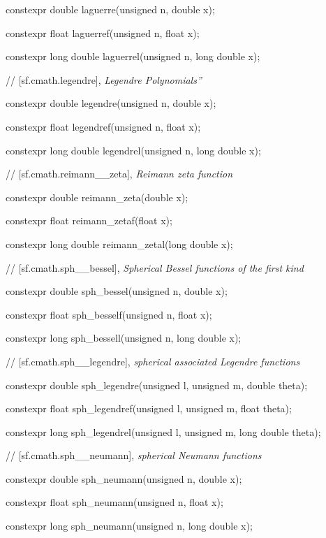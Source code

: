 \documentclass[prd,twocolumn,amsmath,amssymb,nofootinbib,eqsecnum]{revtex4-1}
\newcommand{\highlight}[1]{{\color{red} #1}}
\begin{document}
{\highlight{constexpr} double laguerre(unsigned n, double x);
	
\highlight{constexpr} float laguerref(unsigned n, float x);
	
\highlight{constexpr} long double laguerrel(unsigned n, long double x);

\vspace{2ex}
// [sf.cmath.legendre], {\em Legendre Polynomials''  }
\vspace{2ex}

\highlight{constexpr} double legendre(unsigned n, double x);
	
\highlight{constexpr} float legendref(unsigned n, float x);
	
\highlight{constexpr} long double legendrel(unsigned n, long double x);

\vspace{2ex}
// [sf.cmath.reimann\_\_zeta], {\em Reimann zeta function}
\vspace{2ex}

\highlight{constexpr} double reimann\_zeta(double x);
	
\highlight{constexpr} float reimann\_zetaf(float x);
	
\highlight{constexpr} long double reimann\_zetal(long double x);

\vspace{2ex}
// [sf.cmath.sph\_\_bessel], {\em Spherical Bessel functions of the first kind}
\vspace{2ex}

\highlight{constexpr} double sph\_bessel(unsigned n, double x);
	
\highlight{constexpr} float sph\_besself(unsigned n, float x);
	
\highlight{constexpr} long sph\_bessell(unsigned n, long double x);

\vspace{2ex}
// [sf.cmath.sph\_\_legendre], {\em spherical associated Legendre functions}
\vspace{2ex}

\highlight{constexpr} double sph\_legendre(unsigned l, unsigned m, double theta);
	
\highlight{constexpr} float sph\_legendref(unsigned l, unsigned m, float theta);
	
\highlight{constexpr} long sph\_legendrel(unsigned l, unsigned m, long double theta);

\vspace{2ex}
// [sf.cmath.sph\_\_neumann], {\em spherical Neumann functions}
\vspace{2ex}

\highlight{constexpr} double sph\_neumann(unsigned n, double x);
	
\highlight{constexpr} float sph\_neumann(unsigned n, float x);
	
\highlight{constexpr} long sph\_neumann(unsigned n, long double x);

}
\end{document}
